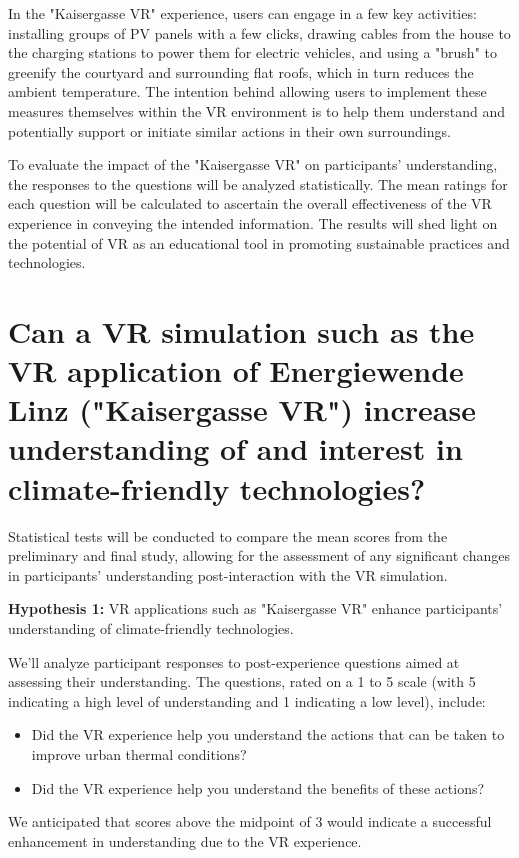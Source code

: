 \documentclass[draft, final]{vutinfth} %
\begin{document}
In the "Kaisergasse VR" experience, users can engage in a few key activities: installing groups of PV panels with a few clicks, drawing cables from the house to the charging stations to power them for electric vehicles, and using a "brush" to greenify the courtyard and surrounding flat roofs, which in turn reduces the ambient temperature. The intention behind allowing users to implement these measures themselves within the VR environment is to help them understand and potentially support or initiate similar actions in their own surroundings.

To evaluate the impact of the "Kaisergasse VR" on participants' understanding, the responses to the questions will be analyzed statistically. The mean ratings for each question will be calculated to ascertain the overall effectiveness of the VR experience in conveying the intended information. The results will shed light on the potential of VR as an educational tool in promoting sustainable practices and technologies.

\section{Can a VR simulation such as the VR application of Energiewende Linz ("Kaisergasse VR") increase understanding of and interest in climate-friendly technologies?}
Statistical tests will be conducted to compare the mean scores from the preliminary and final study, allowing for the assessment of any significant changes in participants' understanding post-interaction with the VR simulation.

\textbf{Hypothesis 1:} VR applications such as "Kaisergasse VR" enhance participants' understanding of climate-friendly technologies.

We'll analyze participant responses to post-experience questions aimed at assessing their understanding. The questions, rated on a 1 to 5 scale (with 5 indicating a high level of understanding and 1 indicating a low level), include:
\begin{itemize}
    \item Did the VR experience help you understand the actions that can be taken to improve urban thermal conditions?
    \item Did the VR experience help you understand the benefits of these actions?
\end{itemize}
We anticipated that scores above the midpoint of 3 would indicate a successful enhancement in understanding due to the VR experience.
\end{document}
